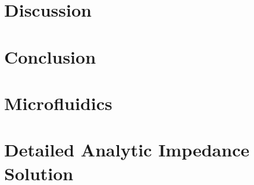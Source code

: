 \documentclass[12pt]{report}
\begin{document}
\chapter{Discussion}


\chapter{Conclusion}


\begin{appendices}

\chapter{Microfluidics}


\chapter[Analytic IS]{Detailed Analytic Impedance Solution}


\end{appendices}
%
%
%
%


{} 
\singlespacing
\printbibliography
\end{document}
